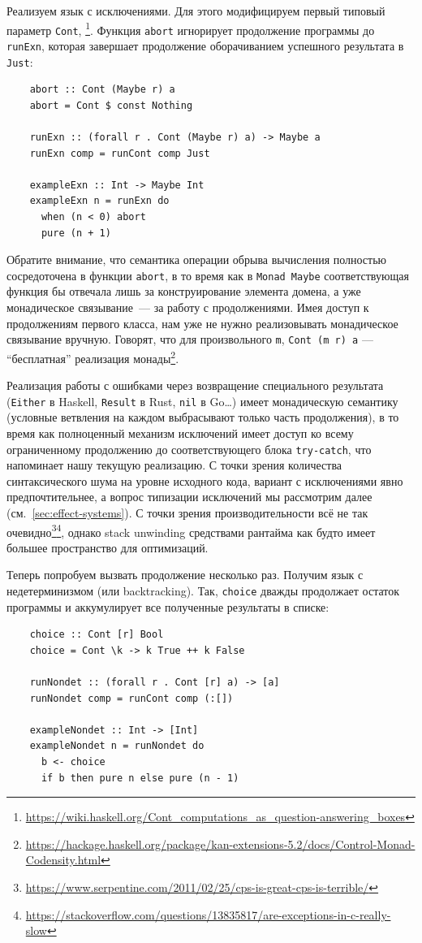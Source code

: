 Реализуем язык с исключениями.
Для этого модифицируем первый типовый параметр \texttt{Cont}, \footnote{\url{https://wiki.haskell.org/Cont_computations_as_question-answering_boxes}}.
Функция \texttt{abort} игнорирует продолжение программы до \texttt{runExn}, которая завершает продолжение оборачиванием успешного результата в \texttt{Just}:
\begin{verbatim}
    abort :: Cont (Maybe r) a
    abort = Cont $ const Nothing

    runExn :: (forall r . Cont (Maybe r) a) -> Maybe a
    runExn comp = runCont comp Just

    exampleExn :: Int -> Maybe Int
    exampleExn n = runExn do
      when (n < 0) abort
      pure (n + 1)
\end{verbatim}
Обратите внимание, что семантика операции обрыва вычисления полностью сосредоточена в функции \texttt{abort}, в то время как в \texttt{Monad Maybe} соответствующая функция бы отвечала лишь за конструирование элемента домена, а уже монадическое связывание~--- за работу с продолжениями.
Имея доступ к продолжениям первого класса, нам уже не нужно реализовывать монадическое связывание вручную.
Говорят, что для произвольного \texttt{m}, \texttt{Cont (m r) a} --- ``бесплатная'' реализация монады\footnote{\url{https://hackage.haskell.org/package/kan-extensions-5.2/docs/Control-Monad-Codensity.html}}.

Реализация работы с ошибками через возвращение специального результата (\texttt{Either} в Haskell, \texttt{Result} в Rust, \texttt{nil} в Go\ldots) имеет монадическую семантику (условные ветвления на каждом выбрасывают только часть продолжения), в то время как полноценный механизм исключений имеет доступ ко всему ограниченному продолжению до соответствующего блока \texttt{try-catch}, что напоминает нашу текущую реализацию.
С точки зрения количества синтаксического шума на уровне исходного кода, вариант с исключениями явно предпочтительнее, а вопрос типизации исключений мы рассмотрим далее (см.\ \ref{sec:effect-systems}).
С точки зрения производительности всё не так очевидно\footnote{\url{https://www.serpentine.com/2011/02/25/cps-is-great-cps-is-terrible/}}\footnote{\url{https://stackoverflow.com/questions/13835817/are-exceptions-in-c-really-slow}}, однако stack unwinding средствами рантайма как будто имеет большее пространство для оптимизаций.

Теперь попробуем вызвать продолжение несколько раз.
Получим язык с недетерминизмом (или backtracking).
Так, \texttt{choice} дважды продолжает остаток программы и аккумулирует все полученные результаты в списке:
\begin{verbatim}
    choice :: Cont [r] Bool
    choice = Cont \k -> k True ++ k False

    runNondet :: (forall r . Cont [r] a) -> [a]
    runNondet comp = runCont comp (:[])

    exampleNondet :: Int -> [Int]
    exampleNondet n = runNondet do
      b <- choice
      if b then pure n else pure (n - 1)
\end{verbatim}

